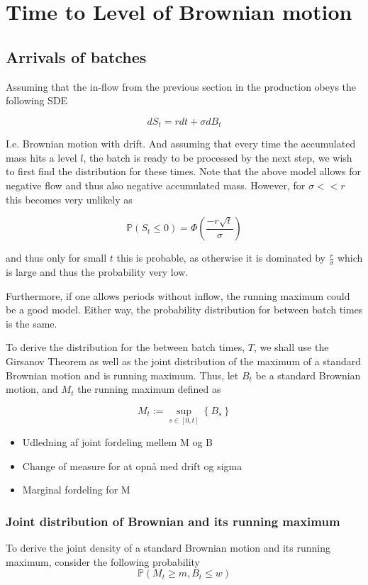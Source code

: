 \documentclass[../Thesis.tex]{subfiles}
\begin{document}
\chapter{Time to Level of Brownian motion}


\section{Arrivals of batches}
Assuming that the in-flow from the previous section in the production obeys the following SDE

$$dS_t = r dt + \sigma dB_t$$

I.e. Brownian motion with drift. And assuming that every time the accumulated mass hits a level $l$, the batch is ready to be processed by the next step, we wish to first find the distribution for these times. Note that the above model allows for negative flow and thus also negative accumulated mass. However, for $\sigma << r$ this becomes very unlikely as

$$\mathbb{P} \left( S_t \leq 0\right) = \Phi \left( \frac{-r \sqrt{t}}{\sigma } \right)$$

and thus only for small $t$ this is probable, as otherwise it is dominated by $\frac{r}{\sigma}$ which is large and thus the probability very low.

Furthermore, if one allows periods without inflow, the running maximum could be a good model. Either way, the probability distribution for between batch times is the same.


To derive the distribution for the between batch times, $T$, we shall use the Girsanov Theorem as well as the joint distribution of the maximum of a standard Brownian motion and is running maximum. Thus, let $B_t$ be a standard Brownian motion, and $M_t$ the running maximum defined as

$$M_t := \sup_{s\in [0,t]} \left\{ B_s \right\}$$


\begin{itemize}
    \item Udledning af joint fordeling mellem M og B
    \item Change of measure for at opnå med drift og sigma
    \item Marginal fordeling for M
\end{itemize}





\subsection{Joint distribution of Brownian and its running maximum}
To derive the joint density of a standard Brownian motion and its running maximum, consider the following probability
$$\mathbb{P}\left(M_t \geq m, B_t \leq w\right)$$
\end{document}
